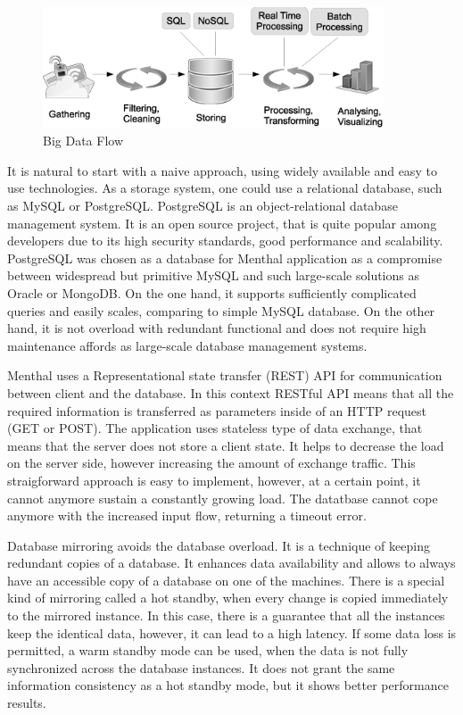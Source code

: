\begin{figure}
  \centering
  \includegraphics [width=0.9\textwidth]{images/big_data_flow}
  \caption{Big Data Flow}
  \label{fig:big_data_flow}
\end{figure}

It is natural to start with a naive approach, using widely available and easy to use technologies.
As a storage system, one could use a relational database, such as MySQL or PostgreSQL.
PostgreSQL is an object-relational database management system.
It is an open source project, that is quite popular among developers due to its high security standards, good performance and scalability.
PostgreSQL was chosen as a database for Menthal application as a compromise between widespread but primitive MySQL and such large-scale solutions as Oracle or MongoDB.
On the one hand, it supports sufficiently complicated queries and easily scales, comparing to simple MySQL database.
On the other hand, it is not overload with redundant functional and does not require high maintenance affords as large-scale database management systems.

Menthal uses a Representational state transfer (REST) API for communication between client and the database.
In this context RESTful API means that all the required information is transferred as parameters inside of an HTTP request (GET or POST).
The application uses stateless type of data exchange, that means that the server does not store a client state.
It helps to decrease the load on the server side, however increasing the amount of exchange traffic.
This straigforward approach is easy to implement, however, at a certain point, it cannot anymore sustain a constantly growing load.
The datatbase cannot cope anymore with the increased input flow, returning a timeout error.

Database mirroring avoids the database overload.
It is a technique of keeping redundant copies of a database.
It enhances data availability and allows to always have an accessible copy of a database on one of the machines.
There is a special kind of mirroring called a hot standby, when every change is copied immediately to the mirrored instance.
In this case, there is a guarantee that all the instances keep the identical data, however, it can lead to a high latency.
If some data loss is permitted, a warm standby mode can be used, when the data is not fully synchronized across the database instances.
It does not grant the same information consistency as a hot standby mode, but it shows better performance results.

